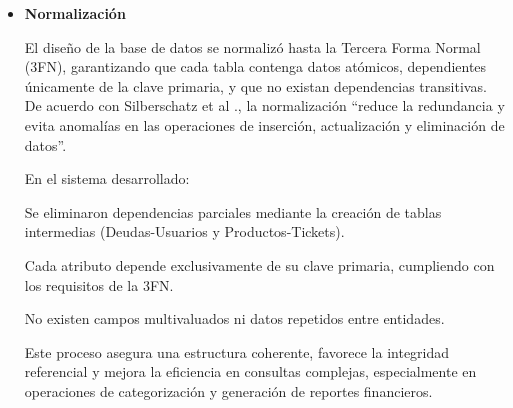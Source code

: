 \begin{itemize}
Las relaciones más relevantes son:

Usuarios-Tickets: relación 1:0..N, donde un usuario puede registrar varios tickets.

Tickets-ProductosTickets: relación 1:0..N, cada ticket puede contener múltiples productos asociados.

Usuarios-Movimientos: relación 1:0..N, un usuario genera múltiples registros financieros.

Categorías-Movimientos: relación 1:N, cada movimiento pertenece a una categoría definida por el usuario.

Usuarios-Deudas-Usuarios: relación 1:0..N, que permite asignar deudas a usuarios específicos.

Categorías-Presupuestos: relación 1:1, cada categoria puede tener un presupuesto.

Según Elmasri y Navathe \cite{TablasYRelaciones}, un buen diseño relacional debe “mantener una estructura normalizada, clara y eficiente, minimizando redundancias y asegurando la 
integridad de los datos”.
En el presente sistema se implementaron índices en los campos más consultados (id-usuario, id-categoria, fecha-creacion) para optimizar el rendimiento en operaciones de 
lectura y filtrado, especialmente en la generación de reportes y estadísticas financieras.

    \item \textbf{Normalización}
    
El diseño de la base de datos se normalizó hasta la Tercera Forma Normal (3FN), garantizando que cada tabla contenga datos atómicos, dependientes únicamente de la clave 
primaria, y que no existan dependencias transitivas.
De acuerdo con Silberschatz et al \cite{Normalización}., la normalización “reduce la redundancia y evita anomalías en las operaciones de inserción, actualización y eliminación de datos”.

En el sistema desarrollado:

Se eliminaron dependencias parciales mediante la creación de tablas intermedias (Deudas-Usuarios y Productos-Tickets).

Cada atributo depende exclusivamente de su clave primaria, cumpliendo con los requisitos de la 3FN.

No existen campos multivaluados ni datos repetidos entre entidades.

Este proceso asegura una estructura coherente, favorece la integridad referencial y mejora la eficiencia en consultas complejas, especialmente en operaciones de categorización y generación de reportes financieros.
\end{itemize}

